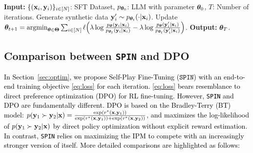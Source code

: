\documentclass{article}
\newcommand{\method}{\texttt{SPIN}}
\def\CC{\textcolor{black}}
\begin{document}
\begin{algorithm}[ht!]
\caption{Self-Play Fine-Tuning ($\method$)}\label{alg:Improving}
\begin{algorithmic}%
\STATE \textbf{Input:} $\{(\mathbf{x}_i, \mathbf{y}_i)\}_{i\in [N]}$: SFT Dataset, $p_{\bm{\theta}_0}$: LLM with parameter $\bm{\theta}_0$, $T$: Number of iterations. 
\STATE Generate synthetic data $\mathbf{y}_{i}' \sim p_{\bm{\theta}_{t}}(\cdot|\mathbf{x}_i)$.
\ENDFOR 
\STATE Update $\bm{\theta}_{t+1} = \mathop{\mathrm{argmin}}_{\bm{\theta} \in \bm{\Theta}} \sum_{i\in [N]}\ell\Big(\lambda \log \frac{p_{\bm{\theta}}(\mathbf{y}_i | \mathbf{x}_i)}{p_{\bm{\theta}_{t}}(\mathbf{y}_i | \mathbf{x}_i)}-\lambda \log \frac{p_{\bm{\theta}}(\mathbf{y}'_i | \mathbf{x}_i)}{p_{\bm{\theta}_{t}}(\mathbf{y}'_i | \mathbf{x}_i)}\Big)$.
\ENDFOR
\STATE \textbf{Output:} $\bm{\theta}_T$.
\end{algorithmic}
\end{algorithm}



\subsection{Comparison between \method{} and DPO}
\CC{In Section~\ref{sec:optim}, we propose 
Self-Play Fine-Tuning ($\method$) with an end-to-end training objective \eqref{eq:loss} for each iteration. \eqref{eq:loss} bears resemblance to direct preference optimization (DPO) \citep{rafailov2023direct} for RL fine-tuning.} 
\CC{However, \method{} and DPO are fundamentally different. DPO is based on the Bradley-Terry (BT) model: $p(\mathbf{y}_1 \succ \mathbf{y}_2 | \mathbf{x}) = \frac{\exp(r^*(\mathbf{x}, \mathbf{y}_1))}{\exp(r^*(\mathbf{x}, \mathbf{y}_1)) + \exp(r^*(\mathbf{x}, \mathbf{y}_2))}$, and maximizes the log-likelihood of $p(\mathbf{y}_1 \succ \mathbf{y}_2 | \mathbf{x})$ by direct policy optimization without explicit reward estimation. In contrast, \method{} relies on maximizing the IPM to compete with an increasingly stronger version of itself. More detailed comparisons are highlighted as follows:}

\end{document}
